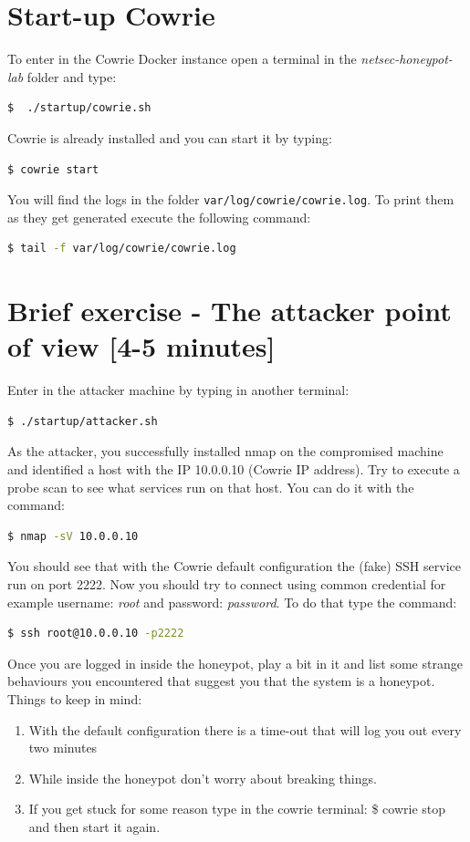 \documentclass[epsfig,a4paper,11pt,titlepage,oneside,openany]{book}
\begin{document}
\section{Start-up Cowrie}
To enter in the Cowrie Docker instance open a terminal in the \textit{netsec-honeypot-lab} folder and type:
\begin{lstlisting}[language=bash]
$  ./startup/cowrie.sh
\end{lstlisting}
Cowrie is already installed and you can start it by typing:
\begin{lstlisting}[language=bash]
$ cowrie start
\end{lstlisting}
You will find the logs in the folder \texttt{var/log/cowrie/cowrie.log}. To print them as they get generated execute the following command:
\begin{lstlisting}[language=bash]
$ tail -f var/log/cowrie/cowrie.log
\end{lstlisting}

\section{Brief exercise - The attacker point of view [4-5 minutes]}
Enter in the attacker machine by typing in another terminal:
\begin{lstlisting}[language=bash]
$ ./startup/attacker.sh
\end{lstlisting}
As the attacker, you successfully installed nmap on the compromised machine and identified a host with the IP 10.0.0.10 (Cowrie IP address). Try to execute a probe scan to see what services run on that host. You can do it with the command:
\begin{lstlisting}[language=bash]
$ nmap -sV 10.0.0.10
\end{lstlisting}
You should see that with the Cowrie default configuration the (fake) SSH service run on port 2222.
Now you should try to connect using common credential for example username: \textit{root} and password: \textit{password}. To do that type the command:
\begin{lstlisting}[language=bash]
$ ssh root@10.0.0.10 -p2222
\end{lstlisting}
Once you are logged in inside the honeypot, play a bit in it and list some strange behaviours you encountered that suggest you that the system is a honeypot.
Things to keep in mind:
\begin{enumerate}
\itemsep0em 
\item With the default configuration there is a time-out that will log you out every two minutes
\item While inside the honeypot don't worry about breaking things.
\item If you get stuck for some reason type in the cowrie terminal: \$ cowrie stop and then start it again.
\end{enumerate}
\end{document}
